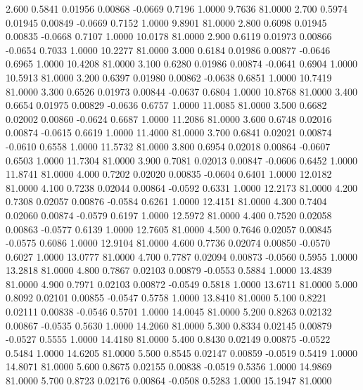    2.600   0.5841   0.01956   0.00868  -0.0669   0.7196   1.0000   9.7636  81.0000
   2.700   0.5974   0.01945   0.00849  -0.0669   0.7152   1.0000   9.8901  81.0000
   2.800   0.6098   0.01945   0.00835  -0.0668   0.7107   1.0000  10.0178  81.0000
   2.900   0.6119   0.01973   0.00866  -0.0654   0.7033   1.0000  10.2277  81.0000
   3.000   0.6184   0.01986   0.00877  -0.0646   0.6965   1.0000  10.4208  81.0000
   3.100   0.6280   0.01986   0.00874  -0.0641   0.6904   1.0000  10.5913  81.0000
   3.200   0.6397   0.01980   0.00862  -0.0638   0.6851   1.0000  10.7419  81.0000
   3.300   0.6526   0.01973   0.00844  -0.0637   0.6804   1.0000  10.8768  81.0000
   3.400   0.6654   0.01975   0.00829  -0.0636   0.6757   1.0000  11.0085  81.0000
   3.500   0.6682   0.02002   0.00860  -0.0624   0.6687   1.0000  11.2086  81.0000
   3.600   0.6748   0.02016   0.00874  -0.0615   0.6619   1.0000  11.4000  81.0000
   3.700   0.6841   0.02021   0.00874  -0.0610   0.6558   1.0000  11.5732  81.0000
   3.800   0.6954   0.02018   0.00864  -0.0607   0.6503   1.0000  11.7304  81.0000
   3.900   0.7081   0.02013   0.00847  -0.0606   0.6452   1.0000  11.8741  81.0000
   4.000   0.7202   0.02020   0.00835  -0.0604   0.6401   1.0000  12.0182  81.0000
   4.100   0.7238   0.02044   0.00864  -0.0592   0.6331   1.0000  12.2173  81.0000
   4.200   0.7308   0.02057   0.00876  -0.0584   0.6261   1.0000  12.4151  81.0000
   4.300   0.7404   0.02060   0.00874  -0.0579   0.6197   1.0000  12.5972  81.0000
   4.400   0.7520   0.02058   0.00863  -0.0577   0.6139   1.0000  12.7605  81.0000
   4.500   0.7646   0.02057   0.00845  -0.0575   0.6086   1.0000  12.9104  81.0000
   4.600   0.7736   0.02074   0.00850  -0.0570   0.6027   1.0000  13.0777  81.0000
   4.700   0.7787   0.02094   0.00873  -0.0560   0.5955   1.0000  13.2818  81.0000
   4.800   0.7867   0.02103   0.00879  -0.0553   0.5884   1.0000  13.4839  81.0000
   4.900   0.7971   0.02103   0.00872  -0.0549   0.5818   1.0000  13.6711  81.0000
   5.000   0.8092   0.02101   0.00855  -0.0547   0.5758   1.0000  13.8410  81.0000
   5.100   0.8221   0.02111   0.00838  -0.0546   0.5701   1.0000  14.0045  81.0000
   5.200   0.8263   0.02132   0.00867  -0.0535   0.5630   1.0000  14.2060  81.0000
   5.300   0.8334   0.02145   0.00879  -0.0527   0.5555   1.0000  14.4180  81.0000
   5.400   0.8430   0.02149   0.00875  -0.0522   0.5484   1.0000  14.6205  81.0000
   5.500   0.8545   0.02147   0.00859  -0.0519   0.5419   1.0000  14.8071  81.0000
   5.600   0.8675   0.02155   0.00838  -0.0519   0.5356   1.0000  14.9869  81.0000
   5.700   0.8723   0.02176   0.00864  -0.0508   0.5283   1.0000  15.1947  81.0000
